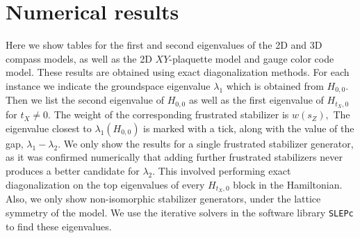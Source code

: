 \documentclass[a4paper,onecolumn,11pt,unpublished]{quantumarticle}
\begin{document}
%



\section{Numerical results}\label{SecNumerical}

Here we show tables for the first and
second eigenvalues of the 2D and 3D compass models,
as well as the 2D $XY$-plaquette model and gauge color code model.
These results are obtained using exact diagonalization methods.
For each instance we indicate the groundspace eigenvalue
$\lambda_1$ which is obtained from $H_{0,0}.$
Then we list the second eigenvalue of $H_{0,0}$ as
well as the first eigenvalue of $H_{t_X,0}$ for $t_X\ne 0.$
The weight of the corresponding frustrated stabilizer is $w(s_Z),$
The eigenvalue closest to $\lambda_1(H_{0,0})$ is marked
with a tick, along with the value of the gap, $\lambda_1-\lambda_2.$
We only show the results for a single frustrated
stabilizer generator,
as it was confirmed numerically that 
adding further frustrated stabilizers never 
produces a better candidate for $\lambda_2.$
This involved performing exact diagonalization on 
the top eigenvalues of every $H_{t_X,0}$ block in the Hamiltonian.
Also, we only show non-isomorphic stabilizer generators,
under the lattice symmetry of the model.
We use the iterative solvers in the software library 
{\tt SLEPc} \cite{Hernandez2005} to find these eigenvalues.

\end{document}
